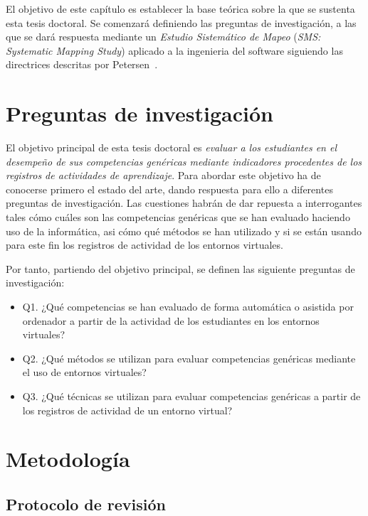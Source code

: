 El objetivo de este capítulo es establecer la base teórica sobre la que se sustenta esta tesis doctoral. Se comenzará definiendo las preguntas de investigación, a las que se dará respuesta mediante un \emph{Estudio Sistemático de Mapeo} (\emph{SMS: Systematic Mapping Study}) aplicado a la ingenieria del software siguiendo las directrices descritas por Petersen~\cite{Petersen:2008}.

\section{Preguntas de investigación}

El objetivo principal de esta tesis doctoral es \emph{evaluar a los estudiantes en el desempeño de sus competencias genéricas mediante indicadores procedentes de los registros de actividades de aprendizaje}. Para abordar este objetivo ha de conocerse primero el estado del arte, dando respuesta para ello a diferentes preguntas de investigación. Las cuestiones habrán de dar repuesta a interrogantes tales cómo cuáles son las competencias genéricas que se han evaluado haciendo uso de la informática, asi cómo qué métodos se han utilizado  y si se están usando para este fin los registros de actividad de los entornos virtuales.

\bigskip
Por tanto, partiendo del objetivo principal, se definen las siguiente preguntas de investigación:
\begin{itemize}
\item Q1. ¿Qué competencias se han evaluado de forma automática o asistida por ordenador a partir de la actividad de los estudiantes en los entornos virtuales?
\item Q2. ¿Qué métodos se utilizan para evaluar competencias genéricas mediante el uso de entornos virtuales?
\item Q3. ¿Qué técnicas se utilizan para evaluar competencias genéricas a partir de los registros de actividad de un entorno virtual?
\end{itemize}

\section{Metodología}

\subsection{Protocolo de revisión}

